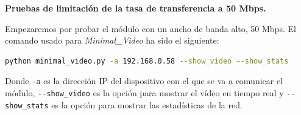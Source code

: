\newpage

\textbf{Pruebas de limitación de la tasa de transferencia a 50 Mbps.}
\vspace{\baselineskip}

Empezaremos por probar el módulo con un ancho de banda alto, 50 Mbps. El comando usado para \textit{Minimal\_Video} ha sido el siguiente:

\begin{lstlisting}[language=bash]
python minimal_video.py -a 192.168.0.58 --show_video --show_stats
\end{lstlisting}
Donde \verb|-a| es la dirección IP del dispositivo con el que se va a comunicar el módulo, \verb|--show_video| es la opción para mostrar el vídeo en tiempo real y \verb|--show_stats| es la opción para mostrar las estadísticas de la red.
\vspace{\baselineskip}

